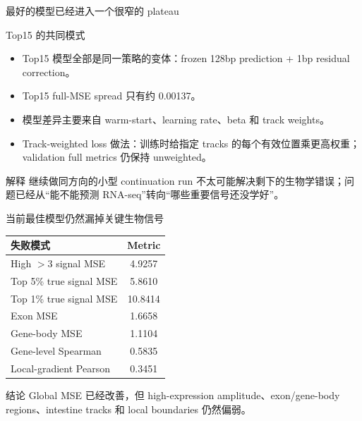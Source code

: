 \documentclass[UTF8,aspectratio=169,10pt]{ctexbeamer}
\begin{document}
\begin{frame}{最好的模型已经进入一个很窄的 plateau}
  \begin{block}{Top15 的共同模式}
    \begin{itemize}
      \item Top15 模型全部是同一策略的变体：frozen 128bp prediction + 1bp residual correction。
      \item Top15 full-MSE spread 只有约 0.00137。
      \item 模型差异主要来自 warm-start、learning rate、beta 和 track weights。
      \item Track-weighted loss 做法：训练时给指定 tracks 的每个有效位置乘更高权重；validation full metrics 仍保持 unweighted。
    \end{itemize}
  \end{block}

  \begin{block}{解释}
    继续做同方向的小型 continuation run 不太可能解决剩下的生物学错误；问题已经从“能不能预测 RNA-seq”转向“哪些重要信号还没学好”。
  \end{block}
\end{frame}

\begin{frame}{当前最佳模型仍然漏掉关键生物信号}
  \centering
  \begin{tabular}{lc}
    \toprule
    失败模式 & Metric \\
    \midrule
    High $>3$ signal MSE & 4.9257 \\
    Top 5\% true signal MSE & 5.8610 \\
    Top 1\% true signal MSE & 10.8414 \\
    Exon MSE & 1.6658 \\
    Gene-body MSE & 1.1104 \\
    Gene-level Spearman & 0.5835 \\
    Local-gradient Pearson & 0.3451 \\
    \bottomrule
  \end{tabular}

  \vspace{0.8em}
  \begin{block}{结论}
    Global MSE 已经改善，但 high-expression amplitude、exon/gene-body regions、intestine tracks 和 local boundaries 仍然偏弱。
  \end{block}
\end{frame}
\end{document}
